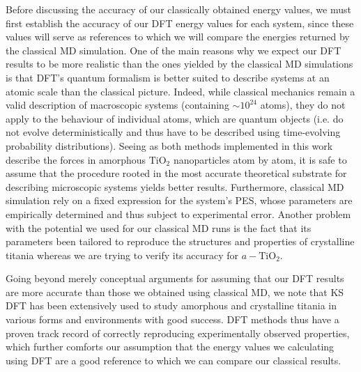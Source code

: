 \documentclass[aps,prb,twocolumn,amsmath,amssymb,superscriptaddress,longbibliography]{revtex4-1}
\newcommand\tab[1][1cm]{\hspace*{#1}} %
\begin{document}
\tab Before discussing the accuracy of our classically obtained energy values, we must first establish the accuracy of our DFT energy values for each system, since these values will serve as references to which we will compare the energies returned by the classical MD simulation.
One of the main reasons why we expect our DFT results to be more realistic than the ones yielded by the classical MD simulations is that DFT's quantum formalism is better suited to describe systems at an atomic scale than the classical picture.
Indeed, while classical mechanics remain a valid description of macroscopic systems (containing $\sim 10^{24}$ atoms), they do not apply to the behaviour of individual atoms, which are quantum objects (i.e. do not evolve deterministically and thus have to be described using time-evolving probability distributions).
Seeing as both methods implemented in this work describe the forces in amorphous $\text{TiO}_2$ nanoparticles atom by atom, it is safe to assume that the procedure rooted in the most accurate theoretical substrate for describing microscopic systems yields better results.
Furthermore, classical MD simulation rely on a fixed expression for the system's PES, whose parameters are empirically determined and thus subject to experimental error.
Another problem with the potential we used for our classical MD runs is the fact that its parameters been tailored to reproduce the structures and properties of crystalline titania whereas we are trying to verify its accuracy for $a-\text{TiO}_2$.

\tab Going beyond merely conceptual arguments for assuming that our DFT results are more accurate than those we obtained using classical MD, we note that KS DFT has been extensively used to study amorphous and crystalline titania in various forms and environments with good success\cite{ab_initio,electronic_structure,realistic_nnp,tio2_dft}.
DFT methods thus have a proven track record of correctly reproducing experimentally observed properties, which further comforts our assumption that the energy values we calculating using DFT are a good reference to which we can compare our classical results.
\end{document}
